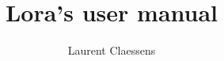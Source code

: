 \documentclass[a4paper,12pt]{article}
\begin{document}
\title{Lora's user manual}
\author{Laurent Claessens}
\maketitle
\end{document}
